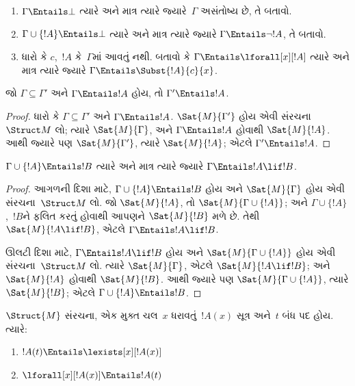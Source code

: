\begin{prob}
\begin{enumerate}
\item $\Gamma\Entails\bot$ ત્યારે અને માત્ર ત્યારે જ્યારે~$\Gamma$
  અસંતોષ્ય છે, તે બતાવો.
\item $\Gamma\cup\{!A\}\Entails\bot$ ત્યારે અને માત્ર ત્યારે જ્યારે
  $\Gamma\Entails\lnot !A$, તે બતાવો.
\item ધારો કે $c$,~$!A$ કે~$\Gamma$માં આવતું નથી. બતાવો કે
  $\Gamma\Entails\lforall[x][!A]$ ત્યારે અને માત્ર ત્યારે જ્યારે
  $\Gamma\Entails\Subst{!A}{c}{x}$.
\end{enumerate}
\end{prob}

\begin{prop}
જો $\Gamma\subseteq\Gamma'$ અને $\Gamma\Entails !A$ હોય, તો
$\Gamma'\Entails !A$.
\end{prop}

\begin{proof}
ધારો કે $\Gamma\subseteq\Gamma'$ અને $\Gamma\Entails !A$.
$\Sat{M}{\Gamma'}$ હોય એવી સંરચના~$\Struct M$ લો; ત્યારે
$\Sat{M}{\Gamma}$, અને $\Gamma\Entails !A$ હોવાથી $\Sat{M}{!A}$.
આથી જ્યારે પણ $\Sat{M}{\Gamma'}$, ત્યારે $\Sat{M}{!A}$; એટલે
$\Gamma'\Entails !A$.
\end{proof}


\begin{thm}[અર્થાનુસારી નિગમન પ્રમેય]
$\Gamma\cup\{!A\}\Entails !B$ ત્યારે અને માત્ર ત્યારે જ્યારે
$\Gamma\Entails !A\lif !B$.
\end{thm}

\begin{proof}
આગળની દિશા માટે, $\Gamma\cup\{!A\}\Entails !B$ હોય અને
$\Sat{M}{\Gamma}$ હોય એવી સંરચના~$\Struct M$ લો. જો
$\Sat{M}{!A}$, તો $\Sat{M}{\Gamma\cup\{!A\}}$; અને
$\Gamma\cup\{!A\}$,~$!B$ને ફલિત કરતું હોવાથી આપણને
$\Sat{M}{!B}$ મળે છે. તેથી $\Sat{M}{!A\lif !B}$, એટલે
$\Gamma\Entails !A\lif !B$.

ઊલટી દિશા માટે, $\Gamma\Entails !A\lif !B$ હોય અને
$\Sat{M}{\Gamma\cup\{!A\}}$ હોય એવી સંરચના~$\Struct M$ લો.
ત્યારે $\Sat{M}{\Gamma}$, એટલે $\Sat{M}{!A\lif !B}$; અને
$\Sat{M}{!A}$ હોવાથી $\Sat{M}{!B}$. આથી જ્યારે પણ
$\Sat{M}{\Gamma\cup\{!A\}}$, ત્યારે $\Sat{M}{!B}$; એટલે
$\Gamma\cup\{!A\}\Entails !B$.
\end{proof}

\begin{prop}
  $\Struct{M}$ સંરચના, એક મુક્ત ચલ~$x$ ધરાવતું~$!A(x)$
  સૂત્ર અને~$t$ બંધ પદ હોય. ત્યારે:
  \begin{enumerate}
    \item $!A(t)\Entails\lexists[x][!A(x)]$
    \item $\lforall[x][!A(x)]\Entails !A(t)$
  \end{enumerate}
\end{prop}


